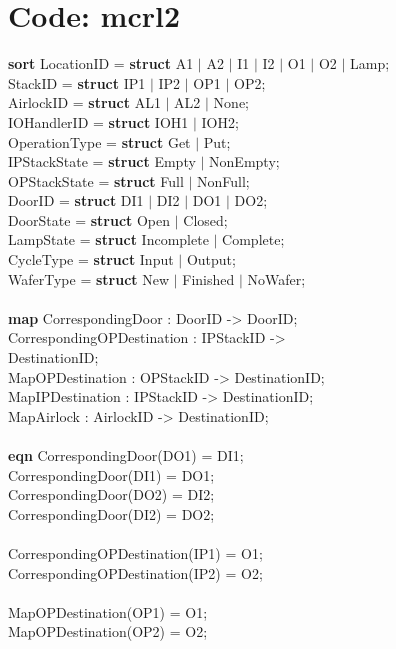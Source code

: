 \documentclass[a4paper,12pt]{article}
\begin{document}
\section{Code: mcrl2}
\textbf{sort} LocationID = \textbf{struct} A1 $|$ A2 $|$ I1 $|$ I2 $|$ O1 $|$ O2 $|$ Lamp;
\\		  StackID = \textbf{struct} IP1 $|$ IP2 $|$ OP1 $|$ OP2;
\\		  AirlockID = \textbf{struct} AL1 $|$ AL2 $|$ None;
\\     IOHandlerID = \textbf{struct} IOH1 $|$ IOH2;
\\		  OperationType = \textbf{struct} Get $|$ Put;
\\		  IPStackState = \textbf{struct} Empty $|$ NonEmpty;
\\		  OPStackState = \textbf{struct} Full $|$ NonFull;
\\	    DoorID = \textbf{struct} DI1 $|$ DI2 $|$ DO1 $|$ DO2;		
\\		  DoorState = \textbf{struct} Open $|$ Closed;
\\			LampState = \textbf{struct} Incomplete $|$ Complete;
\\		  CycleType = \textbf{struct} Input $|$ Output;
\\		  WaferType = \textbf{struct} New $|$ Finished $|$ NoWafer;
\\
\\\textbf{map} CorrespondingDoor : DoorID -> DoorID;
\\	  CorrespondingOPDestination : IPStackID -> \\DestinationID;		
\\	  MapOPDestination : OPStackID -> DestinationID;
\\		MapIPDestination : IPStackID -> DestinationID;
\\		MapAirlock : AirlockID -> DestinationID;
\\
\\ \textbf{eqn} CorrespondingDoor(DO1) = DI1;
\\		CorrespondingDoor(DI1) = DO1;
\\		CorrespondingDoor(DO2) = DI2;
\\		CorrespondingDoor(DI2) = DO2;
\\
\\		CorrespondingOPDestination(IP1) = O1;
\\		CorrespondingOPDestination(IP2) = O2;
\\
\\		MapOPDestination(OP1) = O1;
\\		MapOPDestination(OP2) = O2;
\end{document}
